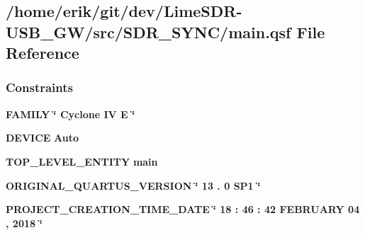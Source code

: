 \subsection{/home/erik/git/dev/\+Lime\+S\+D\+R-\/\+U\+S\+B\+\_\+\+G\+W/src/\+S\+D\+R\+\_\+\+S\+Y\+N\+C/main.qsf File Reference}
\label{main_8qsf}
\subsubsection*{Constraints}
 \begin{DoxyCompactItemize}
\item 
{\bf F\+A\+M\+I\+LY} {\bfseries \textcolor{vhdlchar}{\char`\"{}}\textcolor{vhdlchar}{ }\textcolor{vhdlchar}{Cyclone}\textcolor{vhdlchar}{ }\textcolor{vhdlchar}{IV}\textcolor{vhdlchar}{ }\textcolor{vhdlchar}{E}\textcolor{vhdlchar}{ }\textcolor{vhdlchar}{\char`\"{}}\textcolor{vhdlchar}{ }} 
\item 
{\bf D\+E\+V\+I\+CE} {\bfseries \textcolor{vhdlchar}{Auto}\textcolor{vhdlchar}{ }} 
\item 
{\bf T\+O\+P\+\_\+\+L\+E\+V\+E\+L\+\_\+\+E\+N\+T\+I\+TY} {\bfseries \textcolor{vhdlchar}{main}\textcolor{vhdlchar}{ }} 
\item 
{\bf O\+R\+I\+G\+I\+N\+A\+L\+\_\+\+Q\+U\+A\+R\+T\+U\+S\+\_\+\+V\+E\+R\+S\+I\+ON} {\bfseries \textcolor{vhdlchar}{\char`\"{}}\textcolor{vhdlchar}{ } \textcolor{vhdldigit}{13} \textcolor{vhdlchar}{.} \textcolor{vhdldigit}{0} \textcolor{vhdlchar}{ }\textcolor{vhdlchar}{S\+P1}\textcolor{vhdlchar}{ }\textcolor{vhdlchar}{\char`\"{}}\textcolor{vhdlchar}{ }} 
\item 
{\bf P\+R\+O\+J\+E\+C\+T\+\_\+\+C\+R\+E\+A\+T\+I\+O\+N\+\_\+\+T\+I\+M\+E\+\_\+\+D\+A\+TE} {\bfseries \textcolor{vhdlchar}{\char`\"{}}\textcolor{vhdlchar}{ } \textcolor{vhdldigit}{18} \textcolor{vhdlchar}{ }\textcolor{vhdlchar}{\+:}\textcolor{vhdlchar}{ } \textcolor{vhdldigit}{46} \textcolor{vhdlchar}{ }\textcolor{vhdlchar}{\+:}\textcolor{vhdlchar}{ } \textcolor{vhdldigit}{42} \textcolor{vhdlchar}{ }\textcolor{vhdlchar}{ }\textcolor{vhdlchar}{F\+E\+B\+R\+U\+A\+RY}\textcolor{vhdlchar}{ } \textcolor{vhdldigit}{04} \textcolor{vhdlchar}{ }\textcolor{vhdlchar}{,}\textcolor{vhdlchar}{ }\textcolor{vhdlchar}{ } \textcolor{vhdldigit}{2018} \textcolor{vhdlchar}{ }\textcolor{vhdlchar}{\char`\"{}}\textcolor{vhdlchar}{ }} 
\item 

\end{DoxyCompactItemize}
